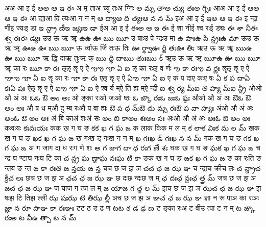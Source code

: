 \documentclass{article}
\begin{document}
\card
{अ}{अ आ इ ई}%
{అ}{అ ఆ ఇ ఈ}
{{अ मृ ता}{अ च्यु तः}{अ ग्निः}}%
{{అ మృ తా}{అ చ్యు తః}{అ గ్నిః}}
\card
{आ}{अ आ इ ई}%
{ఆ}{అ ఆ ఇ ఈ}
{{आ द्या}{आ दि त्यः}{आ न न म्}}%
{{ఆ ద్యా}{ఆ ది త్యః}{ఆ న న మ్}}
\card
{इ}{अ आ इ ई}%
{ఇ}{అ ఆ ఇ ఈ}
{{इ न्द्रा णी}{इ ज्यः}{इ डा}}%
{{ఇ న్ద్రా ణీ}{ఇ జ్యః}{ఇ డా}}
\card
{ई}{अ आ इ ई}%
{ఈ}{అ ఆ ఇ ఈ}
{{ई शा नी}{ई श्व रः}{ई ड्यः}}%
{{ఈ శా నీ}{ఈ శ్వ రః}{ఈ డ్యః}}
\card
{उ}{उ ऊ ऋ ॠ}%
{ఉ}{ఉ ఊ ఋ ౠ}
{{उ षाः}{उ पे न्द्रः}{उ मा}}%
{{ఉ షాః}{ఉ పే న్ద్రః}{ఉ మా}}
\card
{ऊ}{उ ऊ ऋ ॠ}%
{ఊ}{ఉ ఊ ఋ ౠ}
{{ऊ र्ध्वा}{ऊ र्जि तः}{ऊ तिः}}%
{{ఊ ర్ధ్వా}{ఊ ర్జి తః}{ఊ తిః}}
\card
{ऋ}{उ ऊ ऋ ॠ}%
{ఋ}{ఉ ఊ ఋ ౠ}
{{ऋ द्धि दा}{ऋ तुः}{ऋ क्}}%
{{ఋ ద్ధి దా}{ఋ తుః}{ఋ క్}}
\card
{ॠ}{उ ऊ ऋ ॠ}%
{ౠ}{ఉ ఊ ఋ ౠ}
{{ॠ का रः}{ }{ }}%
{{ౠ కా రః}{ }{ }}
\card
{ऌ}{ऌ ॡ ए ऐ}%
{ఌ}{ఌ ౡ ఏ ఐ}
{{ऌ का रः}{ऌ व र्णः}{ }}%
{{ఌ కా రః}{ఌ వ ర్ణః}{ }}
\card
{ॡ}{ऌ ॡ ए ऐ}%
{ౡ}{ఌ ౡ ఏ ఐ}
{{ॡ का रः}{ }{ }}%
{{ౡ కా రః}{ }{ }}
\card
{ए}{ऌ ॡ ए ऐ}%
{ఏ}{ఌ ౡ ఏ ఐ}
{{ए क प दा}{ए कः}{ए षः}}%
{{ఏ క ప దా}{ఏ కః}{ఏ షః}}
\card
{ऐ}{ऌ ॡ ए ऐ}%
{ఐ}{ఌ ౡ ఏ ఐ}
{{ऐ श्व र्य म्}{ऐ ति ह्य म्}{ऐ न्द्री}}%
{{ఐ శ్వ ర్య మ్}{ఐ తి హ్య మ్}{ఐ న్ద్రీ}}
\card
{ओ}{ओ औ अं अः}%
{ఓ}{ఓ ఔ అం అః}
{{ओ ङ्का रः}{ओ जः}{ओ ष्ठः}}%
{{ఓ ఙ్కా రః}{ఓ జః}{ఓ ష్ఠః}}
\card
{औ}{ओ औ अं अः}%
{ఔ}{ఓ ఔ అం అః}
{{औ ष ध म्}{औ दु म्ब रः}{औ प वा ह्यः}}%
{{ఔ ష ధ మ్}{ఔ దు మ్బ రః}{ఔ ప వా హ్యః}}
\card
{अं}{ओ औ अं अः}%
{అం}{ఓ ఔ అం అః}
{{अं बि का}{अं शः}{अं सः}}%
{{అం బి కా}{అం శః}{అం సః}}
\card
{अः}{ओ औ अं अः}%
{అః}{ఓ ఔ అం అః}
{{कः}{वः}{यः}}%
{{కః}{వః}{యః}}
\card
{क}{क ख ग घ ङ}%
{క}{క ఖ గ ఘ ఙ}
{{क ला}{क विः}{क म ल म्}}%
{{క లా}{క విః}{క మ ల మ్}}
\card
{ख}{क ख ग घ ङ}%
{ఖ}{క ఖ గ ఘ ఙ}
{{ख गः}{ख ड् गः}{ख न न म्}}%
{{ఖ గః}{ఖ డ్ గః}{ఖ న న మ్}}
\card
{ग}{क ख ग घ ङ}%
{గ}{క ఖ గ ఘ ఙ}
{{अ ग जा}{ग दा ध रः}{ग णे शः}}%
{{అ గ జా}{గ దా ధ రః}{గ ణే శః}}
\card
{घ}{क ख ग घ ङ}%
{ఘ}{క ఖ గ ఘ ఙ}
{{च न्द्र घ ण्टा}{घ नः}{घ टि का}}%
{{చ న్ద్ర ఘ ణ్టా}{ఘ నః}{ఘ టి కా}}
\card
{ङ}{क ख ग घ ङ}%
{ఙ}{క ఖ గ ఘ ఙ}
{{ङ का रः}{ति ङ न्त}{य ङ न्त}}%
{{ఙ కా రః}{తి ఙ న్త}{య ఙ న్త}}
\card
{च}{च छ ज झ ञ}%
{చ}{చ ఛ జ ఝ ఞ}
{{च न्द्रा}{च क्री}{च लः}}%
{{చ న్ద్రా}{చ క్రీ}{చ లః}}
\card
{छ}{च छ ज झ ञ}%
{ఛ}{చ ఛ జ ఝ ఞ}
{{छ दः}{छ न्दः}{छ त्त्र म्}}%
{{ఛ దః}{ఛ న్దః}{ఛ త్త్ర మ్}}
\card
{ज}{च छ ज झ ञ}%
{జ}{చ ఛ జ ఝ ఞ}
{{ज या}{ज ग त्}{ज ल म्}}%
{{జ యా}{జ గ త్}{జ ల మ్}}
\card
{झ}{च छ ज झ ञ}%
{ఝ}{చ ఛ జ ఝ ఞ}
{{झ षः}{झ टि ति}{झ ल्ली}}%
{{ఝ షః}{ఝ టి తి}{ఝ ల్లీ}}
\card
{ञ}{च छ ज झ ञ}%
{ఞ}{చ ఛ జ ఝ ఞ}
{{ज्ञा न रू पा}{ञ का रः}{ञः}}%
{{జ్ఞా న రూ పా}{ఞ కా రః}{ఞః}}
\card
{ट}{ट ठ ड ढ ण}%
{ట}{ట ఠ డ ఢ ణ}
{{ट ङ्का रः}{अ ट वी}{उ त्पा ट न म्}}%
{{ట ఙ్కా రః}{అ ట వీ}{ఉ త్పా ట న మ్}}
\end{document}
